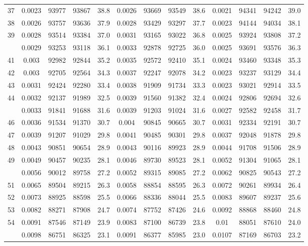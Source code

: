 \documentclass[
  14pt,
]{article}
\begin{document}
\begin{longtable}[t]{lcccccccccccc}
37 & 0.0023 & 93977 & 93867 & 38.8 & 0.0026 & 93669 & 93549 & 38.6 & 0.0021 & 94341 & 94242 & 39.0\\
38 & 0.0026 & 93757 & 93636 & 37.9 & 0.0028 & 93429 & 93297 & 37.7 & 0.0023 & 94144 & 94034 & 38.1\\
39 & 0.0028 & 93514 & 93384 & 37.0 & 0.0031 & 93165 & 93022 & 36.8 & 0.0025 & 93924 & 93808 & 37.2\\
\addlinespace
40 & 0.0029 & 93253 & 93118 & 36.1 & 0.0033 & 92878 & 92725 & 36.0 & 0.0025 & 93691 & 93576 & 36.3\\
41 & 0.003 & 92982 & 92844 & 35.2 & 0.0035 & 92572 & 92410 & 35.1 & 0.0024 & 93460 & 93348 & 35.3\\
42 & 0.003 & 92705 & 92564 & 34.3 & 0.0037 & 92247 & 92078 & 34.2 & 0.0023 & 93237 & 93129 & 34.4\\
43 & 0.0031 & 92424 & 92280 & 33.4 & 0.0038 & 91909 & 91734 & 33.3 & 0.0023 & 93021 & 92914 & 33.5\\
44 & 0.0032 & 92137 & 91989 & 32.5 & 0.0039 & 91560 & 91382 & 32.4 & 0.0024 & 92806 & 92694 & 32.6\\
\addlinespace
45 & 0.0033 & 91841 & 91688 & 31.6 & 0.0039 & 91203 & 91024 & 31.6 & 0.0027 & 92582 & 92458 & 31.7\\
46 & 0.0036 & 91534 & 91370 & 30.7 & 0.004 & 90845 & 90665 & 30.7 & 0.0031 & 92334 & 92191 & 30.7\\
47 & 0.0039 & 91207 & 91029 & 29.8 & 0.0041 & 90485 & 90301 & 29.8 & 0.0037 & 92048 & 91878 & 29.8\\
48 & 0.0043 & 90851 & 90654 & 28.9 & 0.0043 & 90116 & 89923 & 28.9 & 0.0044 & 91708 & 91506 & 28.9\\
49 & 0.0049 & 90457 & 90235 & 28.1 & 0.0046 & 89730 & 89523 & 28.1 & 0.0052 & 91304 & 91065 & 28.1\\
\addlinespace
50 & 0.0056 & 90012 & 89758 & 27.2 & 0.0052 & 89315 & 89085 & 27.2 & 0.0062 & 90825 & 90543 & 27.2\\
51 & 0.0065 & 89504 & 89215 & 26.3 & 0.0058 & 88854 & 88595 & 26.3 & 0.0072 & 90261 & 89934 & 26.4\\
52 & 0.0073 & 88925 & 88598 & 25.5 & 0.0066 & 88336 & 88044 & 25.5 & 0.0083 & 89607 & 89237 & 25.6\\
53 & 0.0082 & 88271 & 87908 & 24.7 & 0.0074 & 87752 & 87426 & 24.6 & 0.0092 & 88868 & 88460 & 24.8\\
54 & 0.0091 & 87546 & 87149 & 23.9 & 0.0083 & 87100 & 86739 & 23.8 & 0.01 & 88051 & 87610 & 24.0\\
\addlinespace
55 & 0.0098 & 86751 & 86325 & 23.1 & 0.0091 & 86377 & 85985 & 23.0 & 0.0107 & 87169 & 86703 & 23.2\\

\end{longtable}
\end{document}
